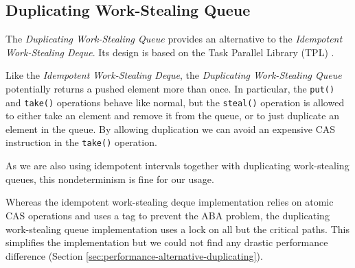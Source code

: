 \subsection{Duplicating Work-Stealing Queue}
\label{sec:queues-alternative-implementations-duplicating-queue}

The \emph{Duplicating Work-Stealing Queue} provides an alternative to
the \emph{Idempotent Work-Stealing Deque}. Its design is based on the
Task Parallel Library (TPL) \cite{Leijen2009}.

Like the \emph{Idempotent Work-Stealing Deque}, the \emph{Duplicating
  Work-Stealing Queue} potentially returns a pushed element more than
once. In particular, the \lstinline!put()!  and \lstinline!take()!
operations behave like normal, but the \lstinline!steal()! operation
is allowed to either take an element and remove it from the queue, or
to just duplicate an element in the queue. By allowing duplication we
can avoid an expensive CAS instruction in the \lstinline!take()!
operation.

As we are also using idempotent intervals together with duplicating
work-stealing queues, this nondeterminism is fine for our usage.

Whereas the idempotent work-stealing deque implementation relies on
atomic CAS operations and uses a tag to prevent the ABA problem, the
duplicating work-stealing queue implementation uses a lock on all but
the critical paths. This simplifies the implementation but we could
not find any drastic performance difference (Section
\ref{sec:performance-alternative-duplicating}).


